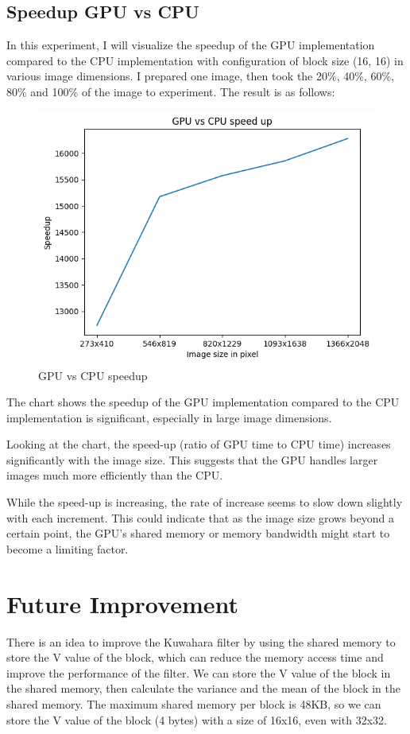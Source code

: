 \documentclass{article}
\begin{document}
\subsection{Speedup GPU vs CPU}
In this experiment, I will visualize the speedup of the GPU implementation compared to the CPU implementation with configuration of block size (16, 16) in various image dimensions. I prepared one image, then took the 20\%, 40\%, 60\%, 80\% and 100\% of the image to experiment. The result is as follows:
\begin{figure}
  \centering
  \includegraphics[width=0.5\linewidth]{results/speedup.png}
  \caption{GPU vs CPU speedup}
  \label{fig:enter-label}
\end{figure}
The chart shows the speedup of the GPU implementation compared to the CPU implementation is significant, especially in large image dimensions.

Looking at the chart, the speed-up (ratio of GPU time to CPU time) increases significantly with the image size. This suggests that the GPU handles larger images much more efficiently than the CPU.

While the speed-up is increasing, the rate of increase seems to slow down slightly with each increment. This could indicate that as the image size grows beyond a certain point, the GPU's shared memory or memory bandwidth might start to become a limiting factor.

\section{Future Improvement}
There is an idea to improve the Kuwahara filter by using the shared memory to store the V value of the block, which can reduce the memory access time and improve the performance of the filter. We can store the V value of the block in the shared memory, then calculate the variance and the mean of the block in the shared memory.
The maximum shared memory per block is 48KB, so we can store the V value of the block (4 bytes) with a size of 16x16, even with 32x32.
\end{document}

